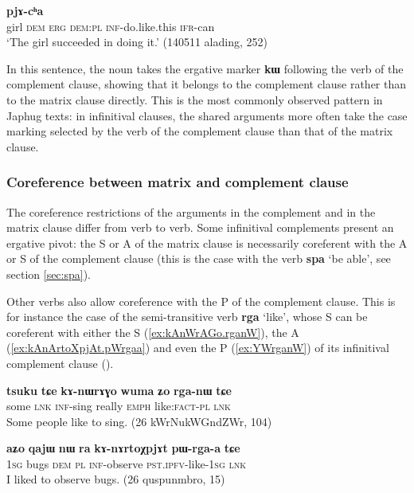 \documentclass[oldfontcommands,oneside,a4paper,11pt]{article}
\newcommand{\ipa}[1]{\textbf{\phon#1}} %
\newcommand{\jpg}[2]{\ipa{#1} `#2'} %
\begin{document}
\begin{exe}
\ex \label{ex:kAstu}
\gll [\ipa{tɤɕime} 	\ipa{nɯ} 	\ipa{kɯ} 	\ipa{nɯra} 	\ipa{kɤ-stu}] 	\ipa{pjɤ-cʰa} \\
girl \textsc{dem} \textsc{erg} \textsc{dem:pl} \textsc{inf}-do.like.this \textsc{ifr}-can \\
\glt `The girl succeeded in doing it.' (140511 alading, 252)
\end{exe}

In this sentence, the noun takes the ergative marker \ipa{kɯ} following the verb of the complement clause, showing that it belongs to the complement clause rather than to the matrix clause directly. This is the most commonly observed pattern in Japhug texts: in infinitival clauses, the shared arguments more often take the case marking selected by the verb of the complement clause than that of the matrix clause.


\subsubsection{Coreference between matrix and complement clause}
The coreference restrictions of the arguments in the complement and in the matrix clause differ from verb to verb. Some infinitival complements present an ergative pivot: the S or A of the matrix clause is necessarily coreferent with the A or S of the complement clause (this is the case with the verb \ipa{spa} `be able', see section \ref{sec:spa}).

Other verbs also allow coreference with the P of the complement clause. This is for instance the case of the semi-transitive verb \jpg{rga}{like}, whose S can be coreferent with either the S  (\ref{ex:kAnWrAGo.rganW}), the A (\ref{ex:kAnArtoXpjAt.pWrgaa}) and even the P (\ref{ex:YWrganW}) of its infinitival complement clause (\citealt{jacques16relatives}).

 \begin{exe}
   \ex   \label{ex:kAnWrAGo.rganW} 
\gll
\ipa{tsuku}  	\ipa{tɕe}  	\ipa{kɤ-nɯrɤɣo}  	\ipa{wuma}  	\ipa{ʑo}  	\ipa{rga-nɯ}  	\ipa{tɕe}  \\
some \textsc{lnk} \textsc{inf}-sing really \textsc{emph} like:\textsc{fact-pl}  \textsc{lnk} \\
  \glt Some people like to sing. (26 kWrNukWGndZWr, 104)
     \end{exe}  
 
   \begin{exe}
   \ex   \label{ex:kAnArtoXpjAt.pWrgaa} 
\gll
  	\ipa{aʑo}  	\ipa{qajɯ}  	\ipa{nɯ} \ipa{ra}  	\ipa{kɤ-nɤrtoχpjɤt}  	\ipa{pɯ-rga-a}  	\ipa{tɕe}  	\\
  	\textsc{1sg} bugs \textsc{dem} \textsc{pl} \textsc{inf}-observe \textsc{pst.ipfv}-like-\textsc{1sg} \textsc{lnk}  \\
 \glt I liked to observe bugs. (26 quspunmbro, 15)
     \end{exe}  
 
\end{document}
